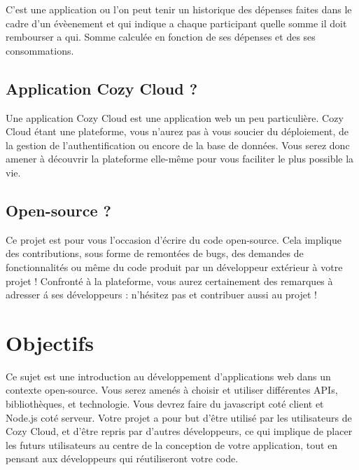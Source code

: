 \documentclass{42-fr}
\begin{document}
		C'est une application ou l'on peut tenir un historique des d\'epenses faites
		dans le cadre d'un \'ev\`eenement et qui indique a chaque participant
		quelle somme il doit rembourser a qui. Somme calcul\'ee en fonction
		de ses d\'epenses et des ses consommations.


	\section{Application Cozy Cloud ?}

		Une application Cozy Cloud est une application web un peu particuli\`ere. 
		Cozy Cloud \'etant une plateforme, vous n'aurez pas \`a vous soucier du 
		d\'eploiement, de la gestion de l'authentification ou encore de la base de 
		donn\'ees. Vous serez donc amener \`a d\'ecouvrir la plateforme elle-m\^eme pour 
		vous faciliter le plus possible la vie.


	\section{Open-source ?}

		Ce projet est pour vous l'occasion d'\'ecrire du code open-source.
		Cela implique des contributions, sous forme de remont\'ees de bugs, des 
		demandes de fonctionnalit\'es ou m\^eme du code produit par un d\'eveloppeur 
		ext\'erieur \`a votre projet !
		Confront\'e \`a la plateforme, vous aurez certainement des remarques \`a 
		adresser \'a ses d\'eveloppeurs : n'h\'esitez pas et contribuer aussi au projet !



\chapter{Objectifs}


	Ce sujet est une introduction au d\'eveloppement d'applications web dans un contexte
	open-source. Vous serez amenés à choisir et utiliser diff\'erentes APIs, 
	biblioth\`eques, et technologie. Vous devrez 	faire du javascript cot\'e 
	client et Node.js cot\'e serveur. Votre projet a pour but d'\^etre utilis\'e
	par les utilisateurs de Cozy Cloud, et d'\^etre repris par d'autres
	d\'eveloppeurs, ce qui implique de placer les futurs utilisateurs au centre
	de la conception de votre application, tout en pensant aux d\'eveloppeurs qui
	r\'eutiliseront votre code.
\end{document}
